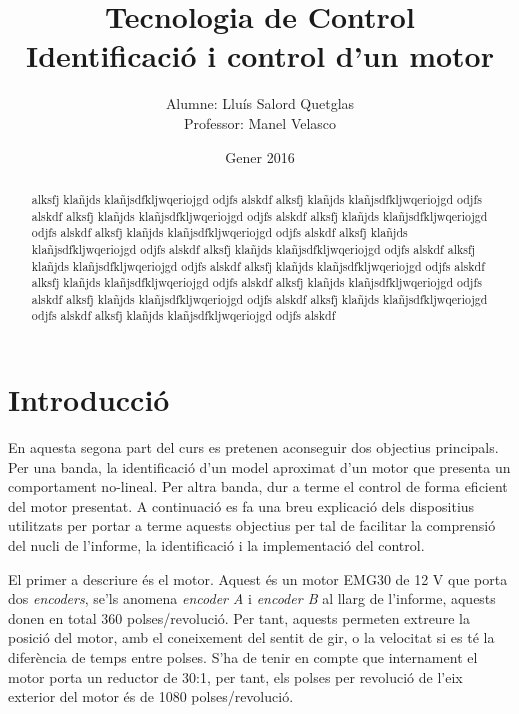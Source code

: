 \documentclass[12pt,a4paper,final,twoside,openright]{report}
\title{Tecnologia de Control \\ Identificació i control d'un motor}
\author{Alumne: Lluís Salord Quetglas \\ Professor: Manel Velasco}
\date{Gener 2016}
\begin{document}
\maketitle
\thispagestyle{empty}

\cleardoublepage

\setcounter{page}{1} %

\begin{abstract}
alksfj klañjds klañjsdfkljwqeriojgd odjfs alskdf alksfj klañjds klañjsdfkljwqeriojgd odjfs alskdf alksfj klañjds klañjsdfkljwqeriojgd odjfs alskdf alksfj klañjds klañjsdfkljwqeriojgd odjfs alskdf alksfj klañjds klañjsdfkljwqeriojgd odjfs alskdf alksfj klañjds klañjsdfkljwqeriojgd odjfs alskdf alksfj klañjds klañjsdfkljwqeriojgd odjfs alskdf alksfj klañjds klañjsdfkljwqeriojgd odjfs alskdf alksfj klañjds klañjsdfkljwqeriojgd odjfs alskdf alksfj klañjds klañjsdfkljwqeriojgd odjfs alskdf alksfj klañjds klañjsdfkljwqeriojgd odjfs alskdf alksfj klañjds klañjsdfkljwqeriojgd odjfs alskdf alksfj klañjds klañjsdfkljwqeriojgd odjfs alskdf alksfj klañjds klañjsdfkljwqeriojgd odjfs alskdf 
\end{abstract}

\tableofcontents

\listoffigures


\chapter{Introducció}

En aquesta segona part del curs es pretenen aconseguir dos objectius principals. Per una banda, la identificació d'un model aproximat d'un motor que presenta un comportament no-lineal. Per altra banda, dur a terme el control de forma eficient del motor presentat. A continuació es fa una breu explicació dels dispositius utilitzats per portar a terme aquests objectius per tal de facilitar la comprensió del nucli de l'informe, la identificació i la implementació del control.

El primer a descriure és el motor. Aquest és un motor EMG30 de 12 V que porta dos \textit{encoders}, se'ls anomena \textit{encoder A} i \textit{encoder B} al llarg de l'informe, aquests donen en total 360 polses/revolució. Per tant, aquests permeten extreure la posició del motor, amb el coneixement del sentit de gir, o la velocitat si es té la diferència de temps entre polses. S'ha de tenir en compte que internament el motor porta un reductor de 30:1, per tant, els polses per revolució de l'eix exterior del motor és de 1080 polses/revolució. 
\end{document}

